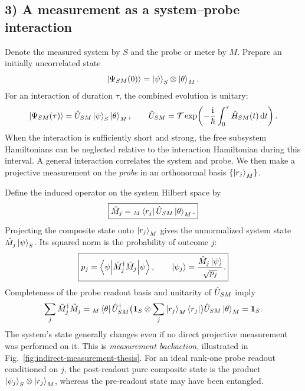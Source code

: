 \subsection*{3) A measurement as a system--probe interaction}

Denote the measured system by $S$ and the probe or meter by $M$. Prepare an initially uncorrelated state
\begin{equation}
\left|\Psi_{SM}(0)\right\rangle=\left|\psi\right\rangle_S\otimes\left|\theta\right\rangle_M.
\end{equation}
For an interaction of duration $\tau$, the combined evolution is unitary:
\begin{equation}
\left|\Psi_{SM}(\tau)\right\rangle=\hat{U}_{SM}\left|\psi\right\rangle_S\left|\theta\right\rangle_M,\qquad
\hat{U}_{SM}=\mathcal{T}\exp\!\left(-\frac{\mathrm{i}}\hbar\int_0^\tau\hat{H}_{SM}(t)\,\mathrm{d} t\right).
\end{equation}
When the interaction is sufficiently short and strong, the free subsystem Hamiltonians can be neglected relative to the interaction Hamiltonian during this interval. A general interaction correlates the system and probe. We then make a projective measurement on the \emph{probe} in an orthonormal basis $\{\left|r_j\right\rangle_M\}$.

Define the induced operator on the system Hilbert space by
\begin{equation}
\boxed{\hat{M}_j={}_M\left\langle r_j\right|\hat{U}_{SM}\left|\theta\right\rangle_M.}
\end{equation}
Projecting the composite state onto $\left|r_j\right\rangle_M$ gives the unnormalized system state $\hat{M}_j\left|\psi\right\rangle_S$. Its squared norm is the probability of outcome $j$:
\begin{equation}
\boxed{p_j=\left\langle\psi\middle|\hat{M}_j^\dagger\hat{M}_j\middle|\psi\right\rangle,\qquad
\left|\psi_j\right\rangle=\frac{\hat{M}_j\left|\psi\right\rangle}{\sqrt{p_j}}.}
\end{equation}
Completeness of the probe readout basis and unitarity of $\hat{U}_{SM}$ imply
\begin{equation}
\sum_j\hat{M}_j^\dagger\hat{M}_j
={}_M\left\langle\theta\right|\hat{U}_{SM}^\dagger
  \bigl(\mathbf1_S\otimes\sum_j\left|r_j\right\rangle_M\left\langle r_j\right|\bigr)
  \hat{U}_{SM}\left|\theta\right\rangle_M=\mathbf1_S.
\end{equation}
The system's state generally changes even if no direct projective measurement was performed on it. This is \emph{measurement backaction}, illustrated in Fig.~\ref{fig:indirect-measurement-thesis}. For an ideal rank-one probe readout conditioned on $j$, the post-readout pure composite state is the product $\left|\psi_j\right\rangle_S\otimes\left|r_j\right\rangle_M$, whereas the pre-readout state may have been entangled.

